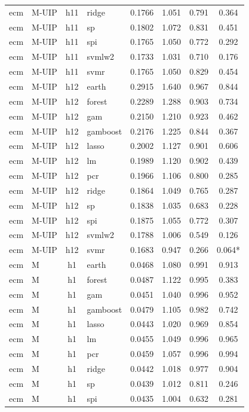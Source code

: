 \begin{ThreePartTable}
\begin{longtable}[t]{llclcccc}
ecm & M-UIP & h11 & ridge & 0.1766 & 1.051 & 0.791 & 0.364\\
ecm & M-UIP & h11 & sp & 0.1802 & 1.072 & 0.831 & 0.451\\
ecm & M-UIP & h11 & spi & 0.1765 & 1.050 & 0.772 & 0.292\\
ecm & M-UIP & h11 & svmlw2 & 0.1733 & 1.031 & 0.710 & 0.176\\
ecm & M-UIP & h11 & svmr & 0.1765 & 1.050 & 0.829 & 0.454\\
\addlinespace
ecm & M-UIP & h12 & earth & 0.2915 & 1.640 & 0.967 & 0.844\\
ecm & M-UIP & h12 & forest & 0.2289 & 1.288 & 0.903 & 0.734\\
ecm & M-UIP & h12 & gam & 0.2150 & 1.210 & 0.923 & 0.462\\
ecm & M-UIP & h12 & gamboost & 0.2176 & 1.225 & 0.844 & 0.367\\
ecm & M-UIP & h12 & lasso & 0.2002 & 1.127 & 0.901 & 0.606\\
ecm & M-UIP & h12 & lm & 0.1989 & 1.120 & 0.902 & 0.439\\
ecm & M-UIP & h12 & pcr & 0.1966 & 1.106 & 0.800 & 0.285\\
ecm & M-UIP & h12 & ridge & 0.1864 & 1.049 & 0.765 & 0.287\\
ecm & M-UIP & h12 & sp & 0.1838 & 1.035 & 0.683 & 0.228\\
ecm & M-UIP & h12 & spi & 0.1875 & 1.055 & 0.772 & 0.307\\
ecm & M-UIP & h12 & svmlw2 & 0.1788 & 1.006 & 0.549 & 0.126\\
ecm & M-UIP & h12 & svmr & 0.1683 & 0.947 & 0.266 & 0.064*\\
\addlinespace
ecm & M & h1 & earth & 0.0468 & 1.080 & 0.991 & 0.913\\
ecm & M & h1 & forest & 0.0487 & 1.122 & 0.995 & 0.383\\
ecm & M & h1 & gam & 0.0451 & 1.040 & 0.996 & 0.952\\
ecm & M & h1 & gamboost & 0.0479 & 1.105 & 0.982 & 0.742\\
ecm & M & h1 & lasso & 0.0443 & 1.020 & 0.969 & 0.854\\
ecm & M & h1 & lm & 0.0455 & 1.049 & 0.996 & 0.965\\
ecm & M & h1 & pcr & 0.0459 & 1.057 & 0.996 & 0.994\\
ecm & M & h1 & ridge & 0.0442 & 1.018 & 0.977 & 0.904\\
ecm & M & h1 & sp & 0.0439 & 1.012 & 0.811 & 0.246\\
ecm & M & h1 & spi & 0.0435 & 1.004 & 0.632 & 0.281\\

\end{longtable}
\end{ThreePartTable}
